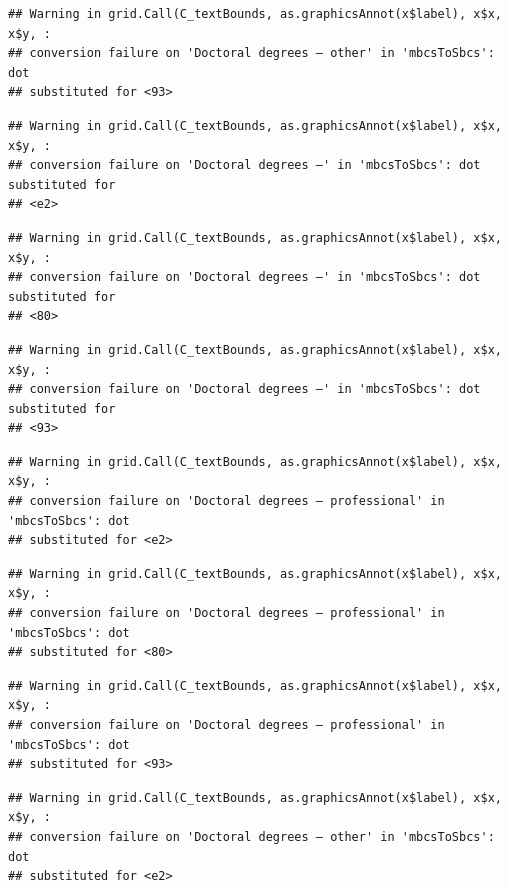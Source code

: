 \documentclass[
]{book}
\begin{document}
\begin{verbatim}
## Warning in grid.Call(C_textBounds, as.graphicsAnnot(x$label), x$x, x$y, :
## conversion failure on 'Doctoral degrees – other' in 'mbcsToSbcs': dot
## substituted for <93>
\end{verbatim}

\begin{verbatim}
## Warning in grid.Call(C_textBounds, as.graphicsAnnot(x$label), x$x, x$y, :
## conversion failure on 'Doctoral degrees –' in 'mbcsToSbcs': dot substituted for
## <e2>
\end{verbatim}

\begin{verbatim}
## Warning in grid.Call(C_textBounds, as.graphicsAnnot(x$label), x$x, x$y, :
## conversion failure on 'Doctoral degrees –' in 'mbcsToSbcs': dot substituted for
## <80>
\end{verbatim}

\begin{verbatim}
## Warning in grid.Call(C_textBounds, as.graphicsAnnot(x$label), x$x, x$y, :
## conversion failure on 'Doctoral degrees –' in 'mbcsToSbcs': dot substituted for
## <93>
\end{verbatim}

\begin{verbatim}
## Warning in grid.Call(C_textBounds, as.graphicsAnnot(x$label), x$x, x$y, :
## conversion failure on 'Doctoral degrees – professional' in 'mbcsToSbcs': dot
## substituted for <e2>
\end{verbatim}

\begin{verbatim}
## Warning in grid.Call(C_textBounds, as.graphicsAnnot(x$label), x$x, x$y, :
## conversion failure on 'Doctoral degrees – professional' in 'mbcsToSbcs': dot
## substituted for <80>
\end{verbatim}

\begin{verbatim}
## Warning in grid.Call(C_textBounds, as.graphicsAnnot(x$label), x$x, x$y, :
## conversion failure on 'Doctoral degrees – professional' in 'mbcsToSbcs': dot
## substituted for <93>
\end{verbatim}

\begin{verbatim}
## Warning in grid.Call(C_textBounds, as.graphicsAnnot(x$label), x$x, x$y, :
## conversion failure on 'Doctoral degrees – other' in 'mbcsToSbcs': dot
## substituted for <e2>
\end{verbatim}
\end{document}
